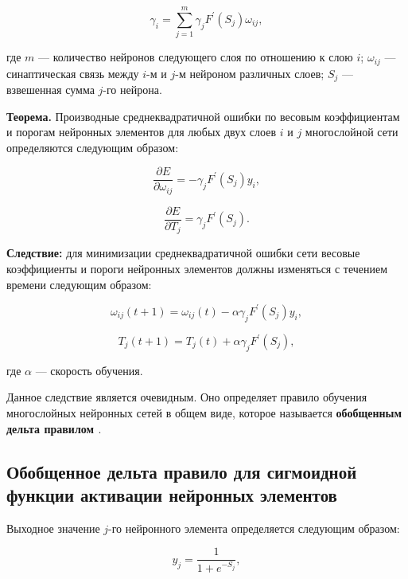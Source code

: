 \begin{equation}
    \gamma_i = \sum_{j = 1}^{m}{\gamma_j F^\prime(S_j)\omega_{i j},}
\end{equation}

где $m$ — количество нейронов следующего слоя по отношению к слою $i$; $\omega_{i j}$ — синаптическая связь между $i$-м и $j$-м нейроном различных слоев; $S_j$ — взвешенная сумма $j$-го нейрона.

\textbf{Теорема.} Производные среднеквадратичной ошибки по весовым коэффициентам и порогам нейронных элементов для любых двух слоев $i$ и $j$ многослойной сети определяются следующим образом:

\begin{equation}
    \frac{\partial E}{\partial\omega_{i j}} = -\gamma_j F^\prime(S_j) y_i,
\end{equation}

\begin{equation}
    \frac{\partial E}{\partial T_j} = \gamma_j F^\prime(S_j).
\end{equation}

\textbf{Следствие:} для минимизации среднеквадратичной ошибки сети весовые коэффициенты и пороги нейронных элементов должны изменяться с течением времени следующим образом:

\begin{equation}
    \omega_{i j}(t + 1) = \omega_{i j}(t) - \alpha\gamma_jF^\prime(S_j) y_i,
\end{equation}

\begin{equation}
    T_j(t + 1) = T_j(t) + \alpha\gamma_jF^\prime(S_j),
\end{equation}

где $\alpha$ — скорость обучения.

Данное следствие является очевидным. Оно определяет правило обучения многослойных нейронных сетей в общем виде, которое называется \textbf{обобщенным дельта правилом \cite{Golovko_2001}}.

\subsection{Обобщенное дельта правило для сигмоидной функции активации нейронных элементов}

Выходное значение $j$-го нейронного элемента определяется следующим образом:

\begin{equation}
    y_j = \frac{1}{1 + e^{-S_j}},
\end{equation}

